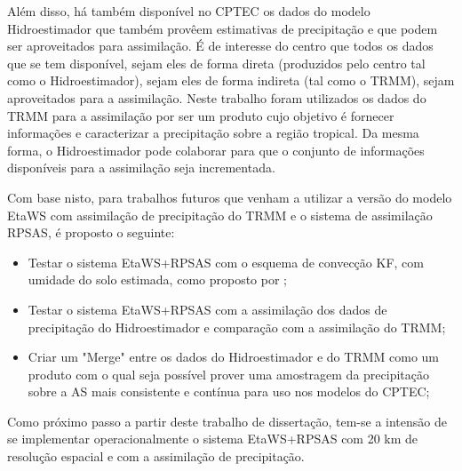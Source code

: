 Além disso, há também disponível no CPTEC os dados do modelo Hidroestimador que também provêem estimativas de precipitação e que podem ser aproveitados para assimilação. É de interesse do centro que todos os dados que se tem disponível, sejam eles de forma direta (produzidos pelo centro tal como o Hidroestimador), sejam eles de forma indireta (tal como o TRMM), sejam aproveitados para a assimilação. Neste trabalho foram utilizados os dados do TRMM para a assimilação por ser um produto cujo objetivo é fornecer informações e caracterizar a precipitação sobre a região tropical. Da mesma forma, o Hidroestimador pode colaborar para que o conjunto de informações disponíveis para a assimilação seja incrementada.

Com base nisto, para trabalhos futuros que venham a utilizar a versão do modelo EtaWS com assimilação de precipitação do TRMM e o sistema de assimilação RPSAS, é proposto o seguinte:

\begin{itemize}
\item Testar o sistema EtaWS+RPSAS com o esquema de convecção KF, com umidade do solo estimada, como proposto por \cite{rozantecavalcanti08};
\item Testar o sistema EtaWS+RPSAS com a assimilação dos dados de precipitação do Hidroestimador e comparação com a assimilação do TRMM;
\item Criar um "Merge" entre os dados do Hidroestimador e do TRMM como um produto com o qual seja possível prover uma amostragem da precipitação sobre a AS mais consistente e contínua para uso nos modelos do CPTEC;
\end{itemize}

Como próximo passo a partir deste trabalho de dissertação, tem-se a intensão de se implementar operacionalmente o sistema EtaWS+RPSAS com 20 km de resolução espacial e com a assimilação de precipitação.
